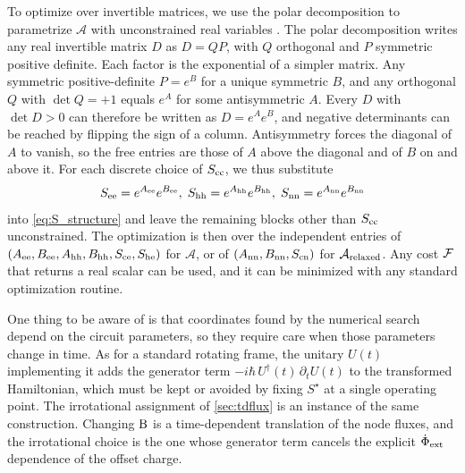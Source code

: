 To optimize over invertible matrices, we use the polar decomposition to parametrize $\mathcal{A}$ with unconstrained real variables \cite{horn2013matrix,gallier2020differential} .
The polar decomposition writes any real invertible matrix $D$ as $D=QP$, with $Q$ orthogonal and $P$ symmetric positive definite.
Each factor is the exponential of a simpler matrix.
Any symmetric positive-definite $P = e^{B}$ for a unique symmetric $B$, and any orthogonal $Q$ with $\det Q=+1$ equals $e^{A}$ for some antisymmetric $A$.
Every $D$ with $\det D>0$ can therefore be written as $D=e^{A}e^{B}$, and negative determinants can be reached by flipping the sign of a column.
Antisymmetry forces the diagonal of $A$ to vanish, so the free entries are those of $A$ above the diagonal and of $B$ on and above it.
For each discrete choice of $S_{\rm cc}$, we thus substitute
\begin{align}
S_{\rm ee}=e^{A_{\rm ee}}e^{B_{\rm ee}},\; S_{\rm hh}=e^{A_{\rm hh}}e^{B_{\rm hh}},\; S_{\rm nn}=e^{A_{\rm nn}}e^{B_{\rm nn}}
\label{eq:S_numerical}
\end{align}
into \cref{eq:S_structure} and leave the remaining blocks other than $S_{\rm cc}$ unconstrained.
The optimization is then over the independent entries of $(A_{\rm ee},B_{\rm ee},A_{\rm hh},B_{\rm hh},S_{\rm ce},S_{\rm he})$ for $\mathcal{A}$, or of $(A_{\rm nn},B_{\rm nn},S_{\rm cn})$ for $\mathcal{A}_{\rm relaxed}$.
Any cost $\mathcal{F}$ that returns a real scalar can be used, and it can be minimized with any standard optimization routine.

One thing to be aware of is that coordinates found by the numerical search depend on the circuit parameters, so they require care when those parameters change in time.
As for a standard rotating frame, the unitary $U(t)$ implementing it adds the generator term $-i\hbar\,U^\dagger(t)\,\partial_tU(t)$ to the transformed Hamiltonian, which must be kept or avoided by fixing $S^\star$ at a single operating point.
The irrotational assignment of \cref{sec:tdflux} is an instance of the same construction.
Changing $\mathrm{B}$ is a time-dependent translation of the node fluxes, and the irrotational choice is the one whose generator term cancels the explicit $\dot\Phi_{\rm ext}$ dependence of the offset charge.

